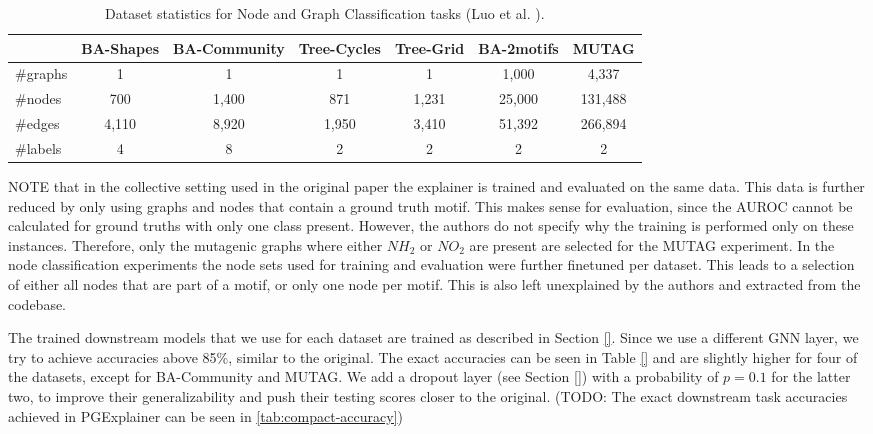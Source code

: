 \begin{table}[h]
    \centering
    \scriptsize
    \begin{tabular}{l|cccc|cc}
    \hline
    \textbf{} & \textbf{BA-Shapes} & \textbf{BA-Community} & \textbf{Tree-Cycles} & \textbf{Tree-Grid} & \textbf{BA-2motifs} & \textbf{MUTAG} \\
    \hline
    \#graphs & 1 & 1 & 1 & 1 & 1,000 & 4,337 \\
    \#nodes  & 700 & 1,400 & 871 & 1,231 & 25,000 & 131,488 \\
    \#edges  & 4,110 & 8,920 & 1,950 & 3,410 & 51,392 & 266,894 \\
    \#labels & 4 & 8 & 2 & 2 & 2 & 2 \\
    \hline
    \end{tabular}
    \caption[Statistics of PGExplainer datasets]{Dataset statistics for Node and Graph Classification tasks (Luo et al. \cite{luo2020parameterized}).}
    \label{tab:dataset-statistics}
\end{table}

NOTE that in the collective setting used in the original paper the explainer is trained and evaluated on the same data. This data is further reduced by only using graphs and nodes that contain a ground truth motif. This makes sense for evaluation, since the AUROC cannot be calculated for ground truths with only one class present. However, the authors do not specify why the training is performed only on these instances. Therefore, only the mutagenic graphs where either $NH_2$ or $NO_2$ are present are selected for the MUTAG experiment. In the node classification experiments the node sets used for training and evaluation were further finetuned per dataset. This leads to a selection of either all nodes that are part of a motif, or only one node per motif. This is also left unexplained by the authors and extracted from the codebase.


The trained downstream models that we use for each dataset are trained as described in Section \ref{}. Since we use a different GNN layer, we try to achieve accuracies above 85\%, similar to the original. The exact accuracies can be seen in Table \ref{} and are slightly higher for four of the datasets, except for BA-Community and MUTAG. We add a dropout layer (see Section \ref{}) with a probability of $p=0.1$ for the latter two, to improve their generalizability and push their testing scores closer to the original. (TODO: The exact downstream task accuracies achieved in PGExplainer can be seen in \ref{tab:compact-accuracy})


